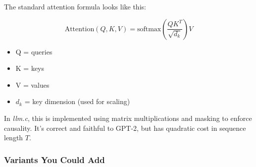 \documentclass[
  letterpaper,
  DIV=11,
  numbers=noendperiod]{scrreprt}
\providecommand{\tightlist}{%
  \setlength{\itemsep}{0pt}\setlength{\parskip}{0pt}}
\begin{document}
The standard attention formula looks like this:

\[
\text{Attention}(Q, K, V) = \text{softmax}\!\left(\frac{QK^T}{\sqrt{d_k}}\right) V
\]

\begin{itemize}
\tightlist
\item
  Q = queries
\item
  K = keys
\item
  V = values
\item
  \(d_k\) = key dimension (used for scaling)
\end{itemize}

In \emph{llm.c}, this is implemented using matrix multiplications and
masking to enforce causality. It's correct and faithful to GPT-2, but
has quadratic cost in sequence length \(T\).

\subsubsection{Variants You Could Add}\label{variants-you-could-add}
\end{document}
